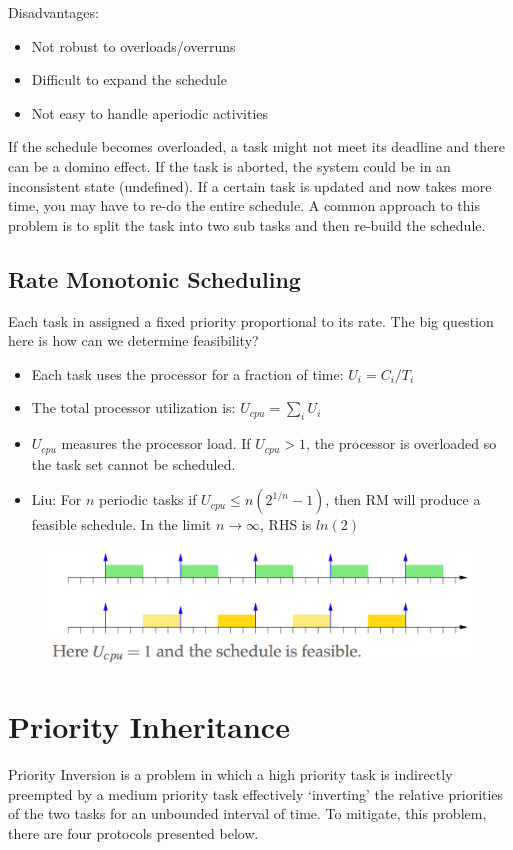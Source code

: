 \documentclass{hw}
\begin{document}
Disadvantages:
\begin{itemize}
  \item Not robust to overloads/overruns
  \item Difficult to expand the schedule
  \item Not easy to handle aperiodic activities
\end{itemize}
If the schedule becomes overloaded, a task might not meet its deadline and there
can be a domino effect. If the task is aborted, the system could be in an 
inconsistent state (undefined). If a certain task is updated and now takes more
time, you may have to re-do the entire schedule. A common approach to this 
problem is to split the task into two sub tasks and then re-build the schedule.

\subsection{Rate Monotonic Scheduling}
Each task in assigned a fixed priority proportional to its rate. The big question
here is how can we determine feasibility?
\begin{itemize}
  \item Each task uses the processor for a fraction of time: $U_{i} = C_{i}/T_{i}$
  \item The total processor utilization is: $U_{cpu} = \sum\limits_{i} U_{i}$
  \item $U_{cpu}$ measures the processor load. If $U_{cpu} > 1$, the processor
    is overloaded so the task set cannot be scheduled. 
  \item Liu: For $n$ periodic tasks if $U_{cpu} \leq n(2^{1/n}-1)$, then RM will
    produce a feasible schedule. In the limit $n \rightarrow \infty$, RHS is 
    $ln(2)$
\end{itemize}
\begin{figure}[H]
  \centering
  \includegraphics[scale=.6]{rm}
\end{figure}

\section{Priority Inheritance}
Priority Inversion is a problem in which a high priority task is indirectly 
preempted by a medium priority task effectively `inverting' the relative 
priorities of the two tasks for an unbounded interval of time. To mitigate, 
this problem, there are four protocols presented below.
\end{document}

